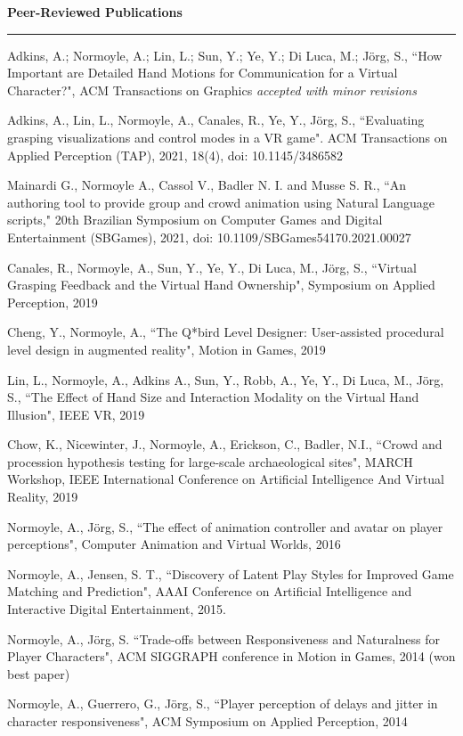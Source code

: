 {\Large {\bf  Peer-Reviewed Publications}}
\vspace{0.1cm}
\hrule
\medskip

Adkins, A.; Normoyle, A.; Lin, L.; Sun, Y.; Ye, Y.; Di Luca, M.; J\"{o}rg, S., ``How Important are Detailed Hand Motions for Communication for a Virtual Character?", ACM Transactions on Graphics \emph{accepted with minor revisions}

Adkins, A., Lin, L., Normoyle, A., Canales, R., Ye, Y., J\"{o}rg, S., ``Evaluating grasping visualizations and control modes in a VR game". ACM Transactions on Applied Perception (TAP), 2021, 18(4), doi: 10.1145/3486582

Mainardi G., Normoyle A., Cassol V., Badler N. I. and Musse S. R., ``An authoring tool to provide group and crowd animation using Natural Language scripts," 20th Brazilian Symposium on Computer Games and Digital Entertainment (SBGames), 2021, doi: 10.1109/SBGames54170.2021.00027

Canales, R., Normoyle, A., Sun, Y., Ye, Y., Di Luca, M., J\"{o}rg, S., ``Virtual Grasping Feedback and the Virtual Hand Ownership", Symposium on Applied Perception, 2019 

Cheng, Y., Normoyle, A., ``The Q*bird Level Designer: User-assisted procedural level design in augmented reality", Motion in Games, 2019 

Lin, L., Normoyle, A., Adkins A., Sun, Y., Robb, A., Ye, Y., Di Luca, M., J\"{o}rg, S., ``The Effect of Hand Size and Interaction Modality on the Virtual Hand Illusion", IEEE VR, 2019

Chow, K., Nicewinter, J., Normoyle, A., Erickson, C., Badler, N.I., ``Crowd and procession hypothesis testing for large-scale archaeological sites", MARCH Workshop, IEEE International Conference on Artificial Intelligence And Virtual Reality, 2019

Normoyle, A., J\"{o}rg, S., ``The effect of animation controller and avatar on player perceptions", 
Computer Animation and Virtual Worlds, 2016 

Normoyle, A., Jensen, S. T., ``Discovery of Latent Play Styles for Improved Game Matching and Prediction", 
AAAI Conference on Artificial Intelligence and Interactive Digital Entertainment, 2015.

Normoyle, A., J\"{o}rg, S. ``Trade-offs between Responsiveness and Naturalness for Player Characters", 
ACM SIGGRAPH conference in Motion in Games, 2014 (won best paper)

Normoyle, A., Guerrero, G., J\"{o}rg, S., ``Player perception of delays and jitter in character responsiveness", 
ACM Symposium on Applied Perception, 2014 

